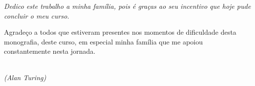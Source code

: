 \documentclass[
	12pt,			%
	openany,		%
	oneside,		%
	a4paper,		%
	english,		%
	brazil			%
	]{abntex2}
\begin{document}

\frenchspacing  %


\imprimircapa

\imprimirfolhaderosto*  %

%
 \begin{fichacatalografica}
 \end{fichacatalografica}


% 
\newpage
\begin{dedicatoria}
  \vspace*{\fill} \centering \noindent 
  \textit{Dedico este trabalho a minha família,  pois é graças ao seu incentivo que hoje pude concluir o meu curso.} 
  \vspace*{\fill}
\end{dedicatoria}

\begin{agradecimentos}
Agradeço a todos que estiveram presentes nos momentos de dificuldade desta monografia, deste curso, em especial minha família que me apoiou constantemente nesta jornada.
\end{agradecimentos}

\begin{epigrafe}
   \vspace*{\fill}
   \begin{flushright}
	\textit{ \\
	(Alan Turing) }
   \end{flushright}
\end{epigrafe}
\end{document}
